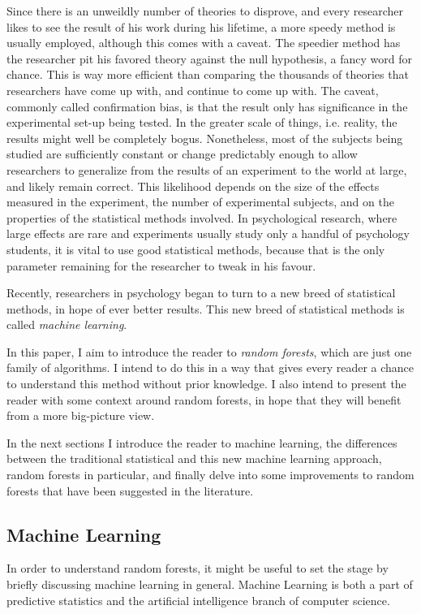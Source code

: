\documentclass[a4paper,man,12pt,apacite]{apa6} %
\begin{document}
Since there is an unweildly number of theories to disprove, and every
researcher likes to see the result of his work during his lifetime, a
more speedy method is usually employed, although this comes with a caveat.
The speedier method has the researcher pit his favored theory against
the null hypothesis, a fancy word for chance.
This is way more efficient than comparing the thousands of
theories that researchers have come up with, and continue to come up with.
The caveat, commonly called confirmation bias, is that the result only
has significance in the experimental set-up being tested.
In the greater scale of things, i.e. reality, the results might well be
completely bogus.
Nonetheless, most of the subjects being studied are sufficiently constant
or change predictably enough to allow researchers to generalize from the
results of an experiment to the world at large, and likely remain correct.
This likelihood depends on the size of the effects measured in the
experiment, the number of experimental subjects, and on the properties of the
statistical methods involved.
In psychological research, where large effects are rare and
experiments usually study only a handful of psychology students, it is
vital to use good statistical methods, because that is the only parameter
remaining for the researcher to tweak in his favour.

Recently, researchers in psychology began to turn to a new breed of
statistical methods, in hope of ever better results. This new breed of
statistical methods is called \emph{machine learning}.

In this paper, I aim to introduce the reader to \emph{random forests},
which are just one family of algorithms.
I intend to do this in a way that gives every reader a chance to understand
this method without prior knowledge. I also intend to present the reader
with some context around random forests, in hope that they will benefit
from a more big-picture view.

In the next sections I introduce the reader to machine learning,
the differences between the traditional statistical and this new
machine learning approach, random forests in particular, and finally delve
into some improvements to random forests that have been suggested in the
literature.

\subsection{Machine Learning}
In order to understand random forests, it might be useful to set
the stage by briefly discussing machine learning in general.
Machine Learning is both a part of predictive statistics and the
artificial intelligence branch of computer science.
\end{document}
